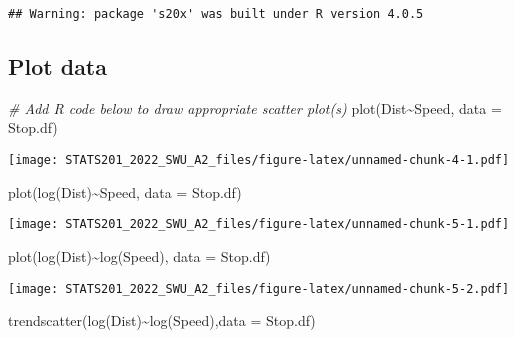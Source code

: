 \documentclass[
]{article}
\newenvironment{Shaded}{\begin{snugshade}}{\end{snugshade}}
\newcommand{\AttributeTok}[1]{\textcolor[rgb]{0.77,0.63,0.00}{#1}}
\newcommand{\CommentTok}[1]{\textcolor[rgb]{0.56,0.35,0.01}{\textit{#1}}}
\newcommand{\FunctionTok}[1]{\textcolor[rgb]{0.00,0.00,0.00}{#1}}
\newcommand{\NormalTok}[1]{#1}
\newcommand{\SpecialCharTok}[1]{\textcolor[rgb]{0.00,0.00,0.00}{#1}}
\begin{document}
\begin{verbatim}
## Warning: package 's20x' was built under R version 4.0.5
\end{verbatim}

\hypertarget{plot-data}{%
\subsection{Plot data}\label{plot-data}}

\begin{Shaded}
\begin{Highlighting}[]
\CommentTok{\# Add R code below to draw appropriate scatter plot(s)}
\FunctionTok{plot}\NormalTok{(Dist}\SpecialCharTok{\textasciitilde{}}\NormalTok{Speed, }\AttributeTok{data =}\NormalTok{ Stop.df)}
\end{Highlighting}
\end{Shaded}

\texttt{[image: STATS201\_2022\_SWU\_A2\_files/figure-latex/unnamed-chunk-4-1.pdf]}

\begin{Shaded}
\begin{Highlighting}[]
\FunctionTok{plot}\NormalTok{(}\FunctionTok{log}\NormalTok{(Dist)}\SpecialCharTok{\textasciitilde{}}\NormalTok{Speed, }\AttributeTok{data =}\NormalTok{ Stop.df)}
\end{Highlighting}
\end{Shaded}

\texttt{[image: STATS201\_2022\_SWU\_A2\_files/figure-latex/unnamed-chunk-5-1.pdf]}

\begin{Shaded}
\begin{Highlighting}[]
\FunctionTok{plot}\NormalTok{(}\FunctionTok{log}\NormalTok{(Dist)}\SpecialCharTok{\textasciitilde{}}\FunctionTok{log}\NormalTok{(Speed), }\AttributeTok{data =}\NormalTok{ Stop.df)}
\end{Highlighting}
\end{Shaded}

\texttt{[image: STATS201\_2022\_SWU\_A2\_files/figure-latex/unnamed-chunk-5-2.pdf]}

\begin{Shaded}
\begin{Highlighting}[]
\FunctionTok{trendscatter}\NormalTok{(}\FunctionTok{log}\NormalTok{(Dist)}\SpecialCharTok{\textasciitilde{}}\FunctionTok{log}\NormalTok{(Speed),}\AttributeTok{data =}\NormalTok{ Stop.df)}
\end{Highlighting}
\end{Shaded}
\end{document}
